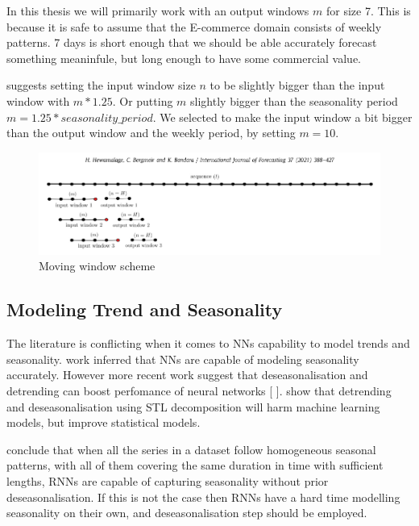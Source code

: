 In this thesis we will primarily work with an output windows $m$ for size 7.
This is because it is safe to assume that the E-commerce domain consists of weekly patterns.
7 days is short enough that we should be able accurately forecast something meaninfule,
but long enough to have some commercial value.

\cite{Hewamalage2021} suggests setting the input window size $n$ to be slightly
bigger than the input window with $m * 1.25$. Or putting $m$ slightly bigger than
the seasonality period $m = 1.25 * seasonality\_period$.
We selected to make the input window a bit bigger than the output window and the weekly
period, by setting $m = 10$.
\begin{figure}[h!]
  \centering
  \includegraphics[width=\textwidth]{./figs/illustrations/moving_window_illustration.png}
  \hfill
  \caption{Moving window scheme \citep{Hewamalage2021}}
  \label{fig:dataset:moving_window_scheme}
\end{figure}



\subsection{Modeling Trend and Seasonality}


The literature is conflicting when it comes to NNs capability to
model trends and seasonality. \cite{Sharda1992} work inferred that NNs are
capable of modeling seasonality accurately.
However more recent work suggest that deseasonalisation and
detrending can boost perfomance of neural networks [\cite{Zhang2005} \cite{Smyl2020}].
\cite{Ouyang2021} show that detrending and deseasonalisation using STL decomposition
will harm machine learning models, but improve statistical models.

\cite{Hewamalage2021} conclude that when all the series in a dataset follow
homogeneous seasonal patterns, with all of them covering the same duration in time
with sufficient lengths, RNNs are capable of capturing seasonality
without prior deseasonalisation.
If this is not the case then RNNs have a hard time modelling
seasonality on their own, and deseasonalisation step should be employed.

